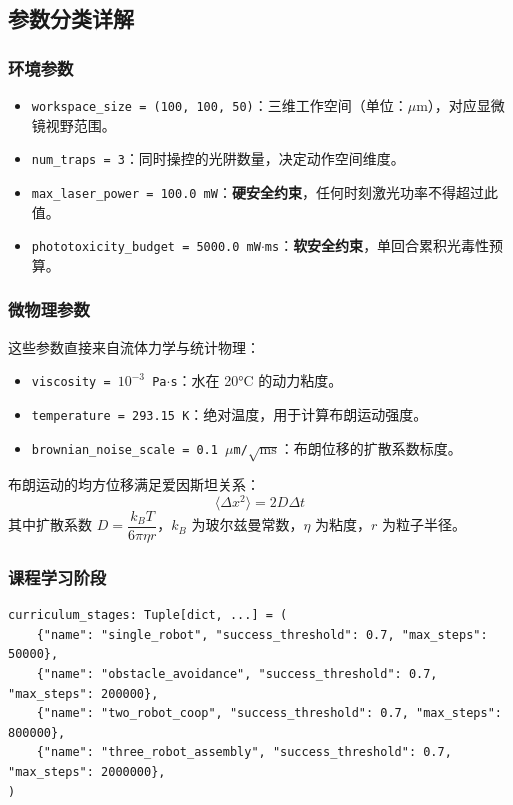 \documentclass[UTF8, a4paper]{ctexart}
\begin{document}
\subsection{参数分类详解}

\subsubsection{环境参数}

\begin{itemize}[leftmargin=2em]
    \item \texttt{workspace\_size = (100, 100, 50)}：三维工作空间（单位：$\mu$m），对应显微镜视野范围。
    \item \texttt{num\_traps = 3}：同时操控的光阱数量，决定动作空间维度。
    \item \texttt{max\_laser\_power = 100.0 mW}：\textbf{硬安全约束}，任何时刻激光功率不得超过此值。
    \item \texttt{phototoxicity\_budget = 5000.0 mW$\cdot$ms}：\textbf{软安全约束}，单回合累积光毒性预算。
\end{itemize}

\subsubsection{微物理参数}

这些参数直接来自流体力学与统计物理：
\begin{itemize}[leftmargin=2em]
    \item \texttt{viscosity = $10^{-3}$ Pa$\cdot$s}：水在 20°C 的动力粘度。
    \item \texttt{temperature = 293.15 K}：绝对温度，用于计算布朗运动强度。
    \item \texttt{brownian\_noise\_scale = 0.1 $\mu$m/$\sqrt{\text{ms}}$}：布朗位移的扩散系数标度。
\end{itemize}

布朗运动的均方位移满足爱因斯坦关系：
\begin{equation}
\langle \Delta x^2 \rangle = 2D\Delta t
\end{equation}
其中扩散系数 $D = \dfrac{k_B T}{6\pi\eta r}$，$k_B$ 为玻尔兹曼常数，$\eta$ 为粘度，$r$ 为粒子半径。

\subsubsection{课程学习阶段}

\begin{lstlisting}
curriculum_stages: Tuple[dict, ...] = (
    {"name": "single_robot", "success_threshold": 0.7, "max_steps": 50000},
    {"name": "obstacle_avoidance", "success_threshold": 0.7, "max_steps": 200000},
    {"name": "two_robot_coop", "success_threshold": 0.7, "max_steps": 800000},
    {"name": "three_robot_assembly", "success_threshold": 0.7, "max_steps": 2000000},
)
\end{lstlisting}
\end{document}
